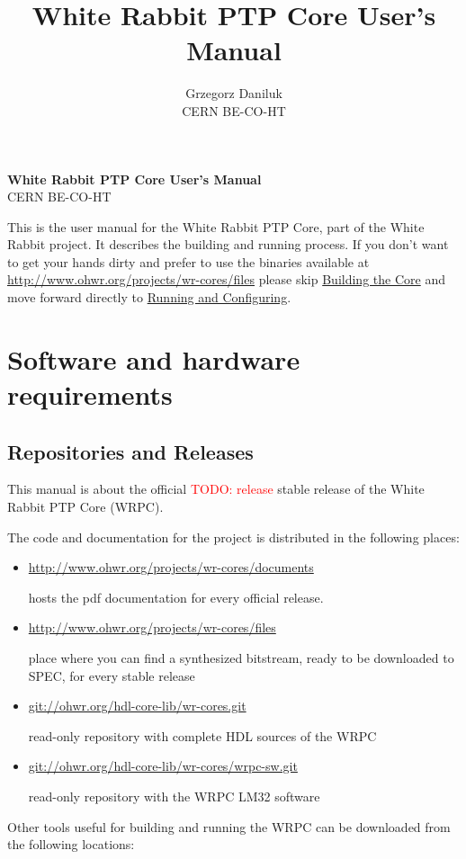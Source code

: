 \documentclass[a4paper, 12pt]{article}
\newcommand{\link}[1]{\hyperref[#1]{#1}}
\newcommand{\codeHook}[1]{\mbox{\ttfamily\MakeTextUppercase{#1}}}
\begin{document}
\title{White Rabbit PTP Core User's Manual}
\author{Grzegorz Daniluk\\ CERN BE-CO-HT}


\begin{center}
	{\huge {\bf White Rabbit PTP Core User's Manual}}\\[0.2 cm]
	{\large CERN BE-CO-HT}\\[0.1 cm]
\end{center}



\abstract

This is the user manual for the White Rabbit PTP Core, part of the White
Rabbit project. It describes the building and running process. If you don't
want to get your hands dirty and prefer to use the binaries available at
\url{http://www.ohwr.org/projects/wr-cores/files} please skip
\link{Building the Core} and move forward directly to
\link{Running and Configuring}.

\newpage

\label{Software and hardware requirements}
\section{Software and hardware requirements}

\label{Repositories and Releases}
\subsection{Repositories and Releases}

This manual is about the official \textcolor{red}{TODO: release} stable release of the White
Rabbit PTP Core (\codeHook{WRPC}).

The code and documentation for the project is distributed in the
following places:

\begin{itemize}

\item \url{http://www.ohwr.org/projects/wr-cores/documents}

	hosts the pdf documentation for every official release.

\item \url{http://www.ohwr.org/projects/wr-cores/files}

	place where you can find a synthesized bitstream, ready to be downloaded to
  SPEC, for every stable release

\item \url{git://ohwr.org/hdl-core-lib/wr-cores.git}

	read-only repository with complete HDL sources of the \codeHook{WRPC}

\item \url{git://ohwr.org/hdl-core-lib/wr-cores/wrpc-sw.git}

  read-only repository with the \codeHook{WRPC} \codeHook{LM32} software

\end{itemize}
Other tools useful for building and running the \codeHook{WRPC} can be downloaded from
the following locations:
\end{document}
